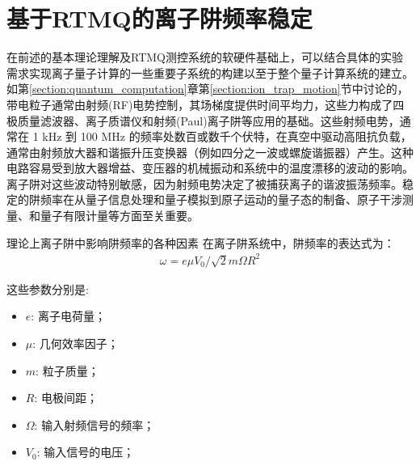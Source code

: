 \newpage
\section[基于RTMQ的离子阱频率稳定]{基于RTMQ的离子阱频率稳定\label{section:trap_frequency_stablization}}

在前述的基本理论理解及RTMQ测控系统的软硬件基础上，可以结合具体的实验需求实现离子量子计算的一些重要子系统的构建以至于整个量子计算系统的建立。
如第\ref{section:quantum_computation}章第\ref{section:ion_trap_motion}节中讨论的，带电粒子通常由射频(RF)电势控制，其场梯度提供时间平均力，这些力构成了四极质量滤波器、离子质谱仪和射频(Paul)离子阱等应用的基础\cite[]{Dehmelt_1990, Paul_1990}。这些射频电势，通常在 1 kHz 到 100 MHz 的频率处数百或数千个伏特，在真空中驱动高阻抗负载，通常由射频放大器和谐振升压变换器（例如四分之一波或螺旋谐振器）产生\cite[]{Siverns_Simkins_Weidt_Hensinger_2012}。这种电路容易受到放大器增益、变压器的机械振动和系统中的温度漂移的波动的影响。离子阱对这些波动特别敏感，因为射频电势决定了被捕获离子的谐波振荡频率。稳定的阱频率在从量子信息处理\cite[]{Blatt_Wineland_2008, Monroe_Kim_2013}和量子模拟\cite[]{Richerme_Gong_Lee_Senko_Smith_Foss_Feig_Michalakis_Gorshkov_Monroe_2014, Jurcevic_Lanyon_Hauke_Hempel_Zoller_Blatt_Roos_2014}到原子运动的量子态的制备\cite[]{Leibfried_Blatt_Monroe_Wineland_2003}、原子干涉测量\cite[]{Johnson_Neyenhuis_Mizrahi_Wong_Campos_Monroe_2015}、和量子有限计量\cite[]{Chou_Hume_Koelemeij_Wineland_Rosenband_2010}等方面至关重要。


理论上离子阱中影响阱频率的各种因素
在离子阱系统中，阱频率的表达式为：
\begin{align}
    \omega=e\mu V_0/\sqrt{2}m\Omega R^2
\end{align}

这些参数分别是:
\begin{itemize}
    \item $e$: 离子电荷量；
    \item $\mu$: 几何效率因子；
    \item $m$: 粒子质量；
    \item $R$: 电极间距；
    \item $\Omega$: 输入射频信号的频率；
    \item $V_0$: 输入信号的电压；
\end{itemize}



